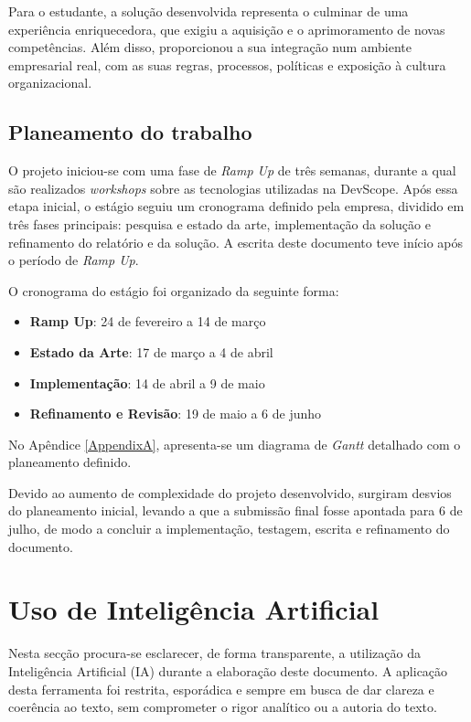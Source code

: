 Para o estudante, a solução desenvolvida representa o culminar de uma experiência enriquecedora, que exigiu a aquisição e o aprimoramento de novas competências. Além disso, proporcionou a sua integração num ambiente empresarial real, com as suas regras, processos, políticas e exposição à cultura organizacional.

\subsection{Planeamento do trabalho}

O projeto iniciou-se com uma fase de \textit{Ramp Up} de três semanas, durante a qual são realizados \textit{workshops} sobre as tecnologias utilizadas na DevScope. Após essa etapa inicial, o estágio seguiu um cronograma definido pela empresa, dividido em três fases principais: pesquisa e estado da arte, implementação da solução e refinamento do relatório e da solução. A escrita deste documento teve início após o período de \textit{Ramp Up}.

O cronograma do estágio foi organizado da seguinte forma:

\begin{itemize}
    \item \textbf{Ramp Up}: 24 de fevereiro a 14 de março
    \item \textbf{Estado da Arte}: 17 de março a 4 de abril
    \item \textbf{Implementação}: 14 de abril a 9 de maio
    \item \textbf{Refinamento e Revisão}: 19 de maio a 6 de junho
\end{itemize}

No Apêndice \ref{AppendixA}, apresenta-se um diagrama de \textit{Gantt} detalhado com o planeamento definido.

Devido ao aumento de complexidade do projeto desenvolvido, surgiram desvios do planeamento inicial, levando a que a submissão final fosse apontada para 6 de julho, de modo a concluir a implementação, testagem, escrita e refinamento do documento.

\section{Uso de Inteligência Artificial}

Nesta secção procura-se esclarecer, de forma transparente, a utilização da Inteligência Artificial (IA) durante a elaboração deste documento. A aplicação desta ferramenta foi restrita, esporádica e sempre em busca de dar clareza e coerência ao texto, sem comprometer o rigor analítico ou a autoria do texto.

